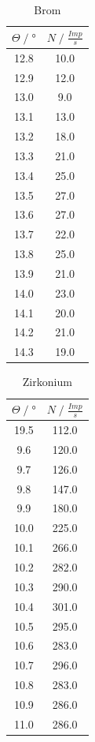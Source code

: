 \label{sec:anhang}
\begin{table}
    \centering
    \begin{tabular}{c c}
        \toprule
        $\Theta\;/\;°$& $N\;/\;\frac{Imp}{s}$\\
        \midrule
        12.8&	10.0\\
        12.9&	12.0\\
        13.0&	9.0\\
        13.1&	13.0\\
        13.2&	18.0\\
        13.3&	21.0\\
        13.4&	25.0\\
        13.5&	27.0\\
        13.6&	27.0\\
        13.7&	22.0\\
        13.8&	25.0\\
        13.9&	21.0\\
        14.0&	23.0\\
        14.1&	20.0\\
        14.2&	21.0\\
        14.3&	19.0\\
        \bottomrule
    \end{tabular}
    \caption{Brom}
\end{table}
\begin{table}
    \centering
    \begin{tabular}{c c}
        \toprule
        $\Theta\;/\;°$& $N\;/\;\frac{Imp}{s}$\\
        \midrule
        19.5	&112.0\\
        9.6	    &120.0\\
        9.7	    &126.0\\
        9.8	    &147.0\\
        9.9	    &180.0\\
        10.0	&225.0\\
        10.1	&266.0\\
        10.2	&282.0\\
        10.3	&290.0\\
        10.4	&301.0\\
        10.5	&295.0\\
        10.6	&283.0\\
        10.7	&296.0\\
        10.8	&283.0\\
        10.9	&286.0\\
        11.0	&286.0\\
        \bottomrule
    \end{tabular}
    \caption{Zirkonium}
\end{table}
